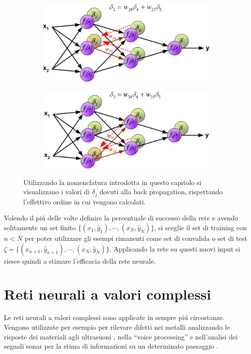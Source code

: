 \documentclass[a4paper,12pt]{report}
\begin{document}
\begin{figure}[h!]
\begin{subfigure}[b]{0.45\linewidth}
  \end{subfigure}
  \\
  \begin{subfigure}[b]{0.45\linewidth}
   \includegraphics[width=\linewidth]{BackPrope.png}
  \end{subfigure}
  \begin{subfigure}[b]{0.45\linewidth}
   \includegraphics[width=\linewidth]{BackPropf.png}
  \end{subfigure}
  \caption{Utilizzando la nomenclatura introdotta in questo capitolo si visualizzano i valori di $\delta_j$ dovuti alla back propagation, rispettando l'effettivo ordine in cui vengono calcolati.}
 \end{figure}
 Volendo il pi\'u delle volte definire la percentuale di successo della rete e avendo solitamente un set finito $\{(x_1,\widehat{y}_1), \cdots , (x_N,\widehat{y}_N)\}$, si sceglie il set di training con $n<N$ per poter utilizzare gli esempi rimanenti come set di convalida o set di test $\zeta = \{(x_{n+1},\widehat{y}_{n+1}), \cdots , (x_N,\widehat{y}_N)\}$. 
 Applicando la rete su questi nuovi input si riesce quindi a stimare l'efficacia della rete neurale.

 
 \chapter*{Reti neurali a valori complessi}
 Le reti neurali a valori complessi sono applicate in sempre pi\'u circostanze. 
 Vengono utilizzate per esempio per rilevare difetti nei metalli analizzando le risposte dei materiali agli ultrasuoni \cite{birx1993complex}, nella ``voice processing'' \cite{sawada2003polar} e nell'analisi dei segnali sonar per la stima di informazioni su un determinato paesaggio \cite{yamaki2008singular}.
 
\end{document}
